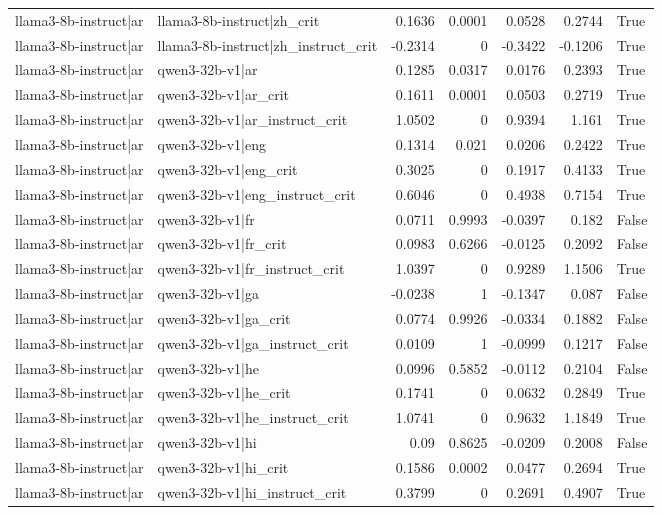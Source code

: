 \begin{table}
\begin{tabular}{l l r r r r l}
llama3-8b-instruct|ar & llama3-8b-instruct|zh_crit & 0.1636 & 0.0001 & 0.0528 & 0.2744 & True \\
llama3-8b-instruct|ar & llama3-8b-instruct|zh_instruct_crit & -0.2314 & 0 & -0.3422 & -0.1206 & True \\
llama3-8b-instruct|ar & qwen3-32b-v1|ar & 0.1285 & 0.0317 & 0.0176 & 0.2393 & True \\
llama3-8b-instruct|ar & qwen3-32b-v1|ar_crit & 0.1611 & 0.0001 & 0.0503 & 0.2719 & True \\
llama3-8b-instruct|ar & qwen3-32b-v1|ar_instruct_crit & 1.0502 & 0 & 0.9394 & 1.161 & True \\
llama3-8b-instruct|ar & qwen3-32b-v1|eng & 0.1314 & 0.021 & 0.0206 & 0.2422 & True \\
llama3-8b-instruct|ar & qwen3-32b-v1|eng_crit & 0.3025 & 0 & 0.1917 & 0.4133 & True \\
llama3-8b-instruct|ar & qwen3-32b-v1|eng_instruct_crit & 0.6046 & 0 & 0.4938 & 0.7154 & True \\
llama3-8b-instruct|ar & qwen3-32b-v1|fr & 0.0711 & 0.9993 & -0.0397 & 0.182 & False \\
llama3-8b-instruct|ar & qwen3-32b-v1|fr_crit & 0.0983 & 0.6266 & -0.0125 & 0.2092 & False \\
llama3-8b-instruct|ar & qwen3-32b-v1|fr_instruct_crit & 1.0397 & 0 & 0.9289 & 1.1506 & True \\
llama3-8b-instruct|ar & qwen3-32b-v1|ga & -0.0238 & 1 & -0.1347 & 0.087 & False \\
llama3-8b-instruct|ar & qwen3-32b-v1|ga_crit & 0.0774 & 0.9926 & -0.0334 & 0.1882 & False \\
llama3-8b-instruct|ar & qwen3-32b-v1|ga_instruct_crit & 0.0109 & 1 & -0.0999 & 0.1217 & False \\
llama3-8b-instruct|ar & qwen3-32b-v1|he & 0.0996 & 0.5852 & -0.0112 & 0.2104 & False \\
llama3-8b-instruct|ar & qwen3-32b-v1|he_crit & 0.1741 & 0 & 0.0632 & 0.2849 & True \\
llama3-8b-instruct|ar & qwen3-32b-v1|he_instruct_crit & 1.0741 & 0 & 0.9632 & 1.1849 & True \\
llama3-8b-instruct|ar & qwen3-32b-v1|hi & 0.09 & 0.8625 & -0.0209 & 0.2008 & False \\
llama3-8b-instruct|ar & qwen3-32b-v1|hi_crit & 0.1586 & 0.0002 & 0.0477 & 0.2694 & True \\
llama3-8b-instruct|ar & qwen3-32b-v1|hi_instruct_crit & 0.3799 & 0 & 0.2691 & 0.4907 & True \\

\end{tabular}
\end{table}
